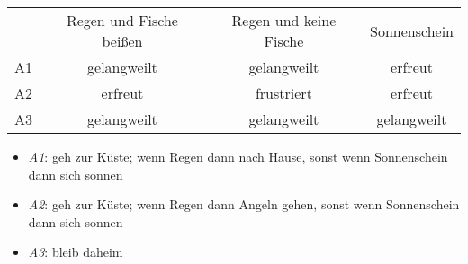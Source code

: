 \begin{tabular}{c|c|c|c|}
\multicolumn{1}{c}{}  & \multicolumn{1}{c}{Regen und Fische beißen}  & \multicolumn{1}{c}{Regen und keine Fische}  & \multicolumn{1}{c}{Sonnenschein} \\ \cline{2-4}
 A1 & gelangweilt & gelangweilt & erfreut \\ \cline{2-4}
 A2 & erfreut & frustriert & erfreut \\ \cline{2-4}
 A3 & gelangweilt & gelangweilt & gelangweilt \\ \cline{2-4}
\end{tabular}
\begin{itemize}
\item {\em A1}: geh zur Küste;  wenn Regen dann nach Hause,  sonst wenn Sonnenschein dann sich sonnen

\item {\em A2}: geh zur Küste;  wenn Regen dann Angeln gehen,  sonst wenn Sonnenschein dann sich sonnen

\item {\em A3}: bleib daheim

\end{itemize}
